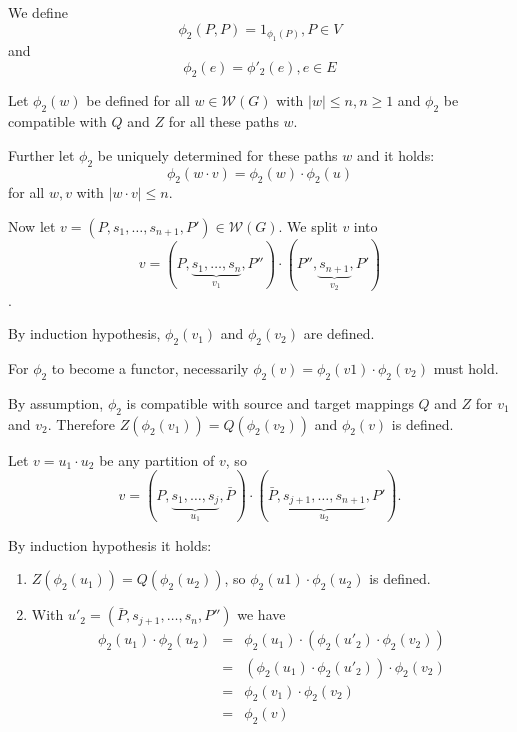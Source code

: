 \begin{center}
\end{center}

We define \[ \phi_2(P,P) = 1_{\phi_1(P)}, P \in V \] and \[ \phi_2(e) =
\phi'_2(e), e \in E \]

Let $\phi_2(w)$ be defined for all $w \in \mathcal{W}(G)$ with $|w| \leq n, n
\geq 1$ and $\phi_2$ be compatible with $Q$ and $Z$ for all these paths $w$.

Further let $\phi_2$ be uniquely determined for these paths $w$ and it holds: \[
\phi_2(w \cdot v) = \phi_2(w) \cdot \phi_2(u) \]
for all $w, v$ with $|w \cdot v| \leq n$.

Now let $v = (P, s_1, \ldots, s_{n+1}, P') \in \mathcal{W}(G)$. We split $v$
into \[ v = (P, \underbrace{s_1, \ldots, s_n}_{v_1}, P'') \cdot (P'',
\underbrace{s_{n+1}}_{v_2}, P') \].

By induction hypothesis, $\phi_2(v_1)$ and $\phi_2(v_2)$ are defined.

For $\phi_2$ to become a functor, necessarily $\phi_2(v) = \phi_2(v1) \cdot
\phi_2(v_2)$ must hold.

By assumption, $\phi_2$ is compatible with source and target mappings $Q$ and
$Z$ for $v_1$ and $v_2$. Therefore $Z(\phi_2(v_1)) = Q(\phi_2(v_2))$ and
$\phi_2(v)$ is defined.

Let $v = u_1 \cdot u_2$ be any partition of $v$, so \[ v = (P, \underbrace{s_1,
\ldots, s_j}_{u_1}, \bar{P}) \cdot (\bar{P}, \underbrace{s_{j+1},
\ldots, s_{n+1}}_{u_2}, P'). \]

By induction hypothesis it holds:
\begin{enumerate}
  \item $Z(\phi_2(u_1)) = Q(\phi_2(u_2))$, so $\phi_2(u1) \cdot \phi_2(u_2)$ is
  defined.
  \item With $u'_2 = (\bar{P}, s_{j+1}, \ldots, s_n, P'')$ we have
  \begin{eqnarray*}
  \phi_2(u_1) \cdot \phi_2(u_2) & = & \phi_2(u_1) \cdot (\phi_2(u'_2) \cdot
  \phi_2(v_2)) \\
  & = & (\phi_2(u_1) \cdot \phi_2(u'_2)) \cdot \phi_2(v_2) \\
  & = & \phi_2(v_1) \cdot \phi_2(v_2) \\
  & = & \phi_2(v)
  \end{eqnarray*}
\end{enumerate}

